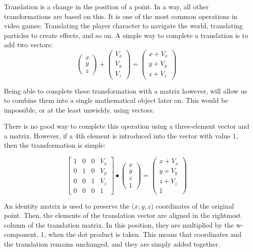 \documentclass{article}
\begin{document}
	Translation is a change in the position of a point. In a way, all other transformations are based on this. It is one of the most common operations in video games: Translating the player character to navigate the world, translating particles to create effects, and so on. A simple way to complete a translation is to add two vectors:
	\[
		\begin{pmatrix}
			x \\
			y \\
			z
		\end{pmatrix}
		+
		\begin{pmatrix}
			V_{x} \\
			V_{y} \\
			V_{z}
		\end{pmatrix}
		=
		\begin{pmatrix}
			x + V_{x} \\
			y + V_{y} \\
			z + V_{z}
		\end{pmatrix}
	\]
	\par
	Being able to complete these transformation with a matrix however, will allow us to combine them into a single mathematical object later on. This would be impossible, or at the least unwieldy, using vectors. \par
	There is no good way to complete this operation using a three-element vector and a matrix. However, if a 4th element is introduced into the vector with value 1, then the transformation is simple: \par
	\[
		\begin{bmatrix}
			1 & 0 & 0 & V_{x} \\
			0 & 1 & 0 & V_{y} \\
			0 & 0 & 1 & V_{z} \\
			0 & 0 & 0 & 1
		\end{bmatrix}
		\bullet
		\begin{pmatrix}
			x \\
			y \\
			z \\
			1
		\end{pmatrix}
		=
		\begin{pmatrix}
			x + V_{x} \\
			y + V_{y} \\
			z + V_{z} \\
			1
		\end{pmatrix}
	\]

	An identity matrix is used to preserve the ($x, y, z$) coordinates of the original point. Then, the elements of the translation vector are aligned in the rightmost column of the translation matrix. In this position, they are multiplied by the w-component, 1, when the dot product is taken. This means that coordinates and the translation remains unchanged, and they are simply added together.
\end{document}
